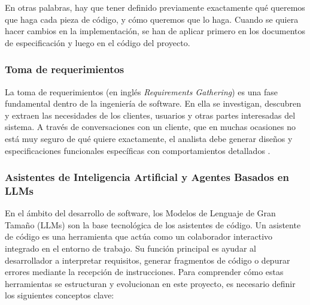 En otras palabras, hay que tener definido previamente exactamente qué queremos que haga cada pieza de código, y cómo queremos que lo haga. Cuando se quiera hacer cambios en la implementación, se han de aplicar primero en los documentos de especificación y luego en el código del proyecto. \\

\subsubsection{Toma de requerimientos}
\label{sec:toma_requerimientos}

La toma de requerimientos (en inglés \textit{Requirements Gathering}) es una fase fundamental dentro de la ingeniería de software. En ella se investigan, descubren y extraen las necesidades de los clientes, usuarios y otras partes interesadas del sistema. A través de conversaciones con un cliente, que en muchas ocasiones no está muy seguro de qué quiere exactamente, el analista debe generar diseños y especificaciones funcionales específicas con comportamientos detallados \cite{jama_requirements} \cite{sommerville_se_2015}.

\subsubsection{Asistentes de Inteligencia Artificial y Agentes Basados en LLMs}
\label{sec:asistentes_ia}

En el ámbito del desarrollo de software, los Modelos de Lenguaje de Gran Tamaño (LLMs) son la base tecnológica de los asistentes de código. Un asistente de código es una herramienta que actúa como un colaborador interactivo integrado en el entorno de trabajo. Su función principal es ayudar al desarrollador a interpretar requisitos, generar fragmentos de código o depurar errores mediante la recepción de instrucciones. Para comprender cómo estas herramientas se estructuran y evolucionan en este proyecto, es necesario definir los siguientes conceptos clave:

